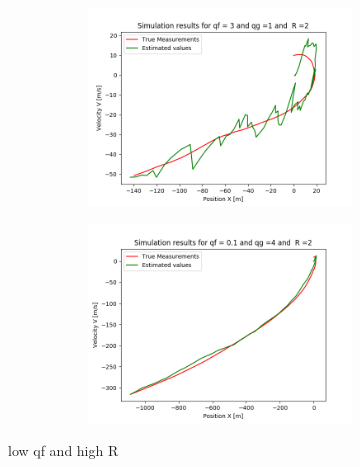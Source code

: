 \documentclass{article}
\begin{document}
        \begin{figure}[H]
            \centering 
            \begin{subfigure}{1\textwidth}  
                \begin{subfigure}{.5\textwidth}  
                    \centering 
                    \includegraphics[width=1\linewidth]{./img/acc/qf3_qg1_r2.png}
                    \caption{}
                \end{subfigure}
                \begin{subfigure}{.5\textwidth}
                    \centering   
                    \includegraphics[width=1\linewidth]{./img/acc/qf01_qg4_r2.png}
                    \caption{}
                \end{subfigure}
            \end{subfigure}
            \caption{low qf and high R}
            \label{fig:accmis}
        \end{figure}
\end{document}
